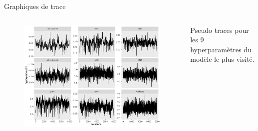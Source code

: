 \documentclass[aspectratio=169]{beamer}
\begin{document}
\begin{frame}{Graphiques de trace}
\begin{columns}
	\begin{column}{0.7\textwidth}
		\begin{figure}
		\vspace{-0.4cm}
	 		\includegraphics[height=0.85\textheight, center]{../figures/traces.pdf}
		\end{figure}
	\end{column}
	\begin{column}{0.3\textwidth}
    Pseudo traces pour les 9 hyperparamètres du modèle le plus visité.
	\end{column}
\end{columns}
\end{frame}
\end{document}
